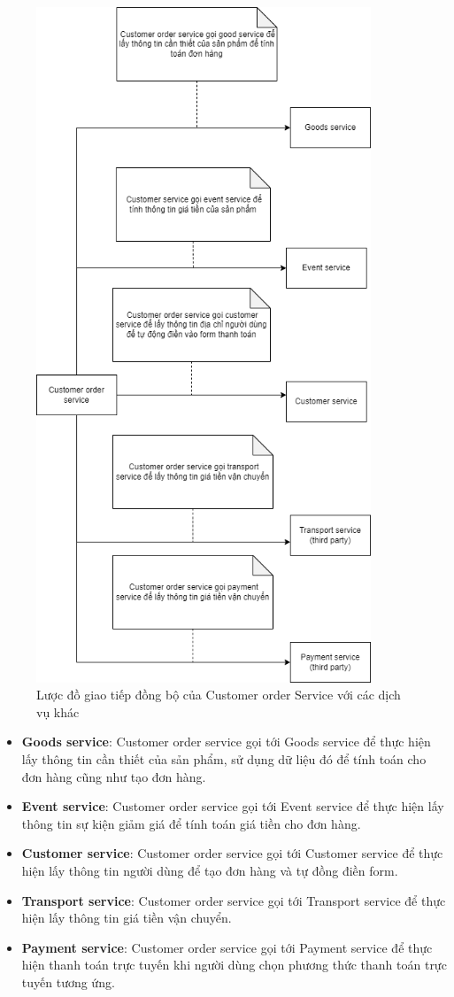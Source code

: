 \begin{figure}[!htp]
	\centering
	\includegraphics[width=10cm]{img/Architecture/service/customer-order-call.png}
	\newline
	\caption{Lược đồ giao tiếp đồng bộ của Customer order Service với các dịch vụ khác}
\end{figure}

\begin{itemize}
	\item \textbf{Goods service}: Customer order service gọi tới Goods service để thực hiện lấy thông tin cần thiết của sản phẩm, sử dụng dữ liệu đó để tính toán cho đơn hàng cũng như tạo đơn hàng.
	\item \textbf{Event service}: Customer order service gọi tới Event service để thực hiện lấy thông tin sự kiện giảm giá để tính toán giá tiền cho đơn hàng.
	\item \textbf{Customer service}: Customer order service gọi tới Customer service để thực hiện lấy thông tin người dùng để tạo đơn hàng và tự đồng điền form.
	\item \textbf{Transport service}: Customer order service gọi tới Transport service để thực hiện lấy thông tin giá tiền vận chuyển.
	\item \textbf{Payment service}: Customer order service gọi tới Payment service để thực hiện thanh toán trực tuyến khi người dùng chọn phương thức thanh toán trực tuyến tương ứng.
\end{itemize}


